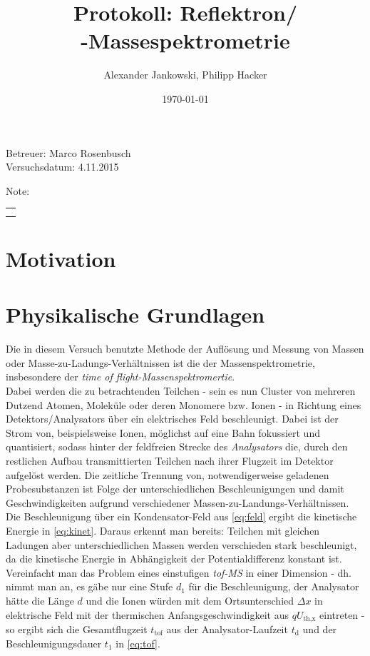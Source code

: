 \documentclass[numbers=noenddot,a4paper,notitlepage,twoside,BCOR15mm]{scrartcl}
\title{Protokoll: Reflektron/\\\tilt{time of flight}-Massespektrometrie} %
\author{Alexander Jankowski, Philipp Hacker}
\date{\today}
\newcommand{\ix}[1]{_\text{#1}}
\newcommand{\tilt}[1]{\textit{#1}}
\begin{document}
	\maketitle
	\begin{center}
		Betreuer: Marco Rosenbusch \\ %
		Versuchsdatum: 4.11.2015 \\ %
		\begin{table}[h]
			\centering
			Note: %
			\begin{tabularx}{1.5cm}{|X|}
				\hline \\ \\
				\hline
			\end{tabularx}
		\end{table}
	\end{center}
	\vspace*{\fill}
	\tableofcontents
	\vfill
	\newpage
	\section{Motivation}
	
	\newpage
	\section{Physikalische Grundlagen}

		Die in diesem Versuch benutzte Methode der Auflösung und Messung von Massen oder Masse-zu-Ladungs-Verhältnissen ist die der Massenspektrometrie, insbesondere der \tilt{time of flight-Massenspektromertie}.\\
		Dabei werden die zu betrachtenden Teilchen - sein es nun Cluster von mehreren Dutzend Atomen, Moleküle oder deren Monomere bzw. Ionen - in Richtung eines Detektors/Analysators über ein elektrisches Feld beschleunigt. Dabei ist der Strom von, beispielsweise Ionen, möglichst auf eine Bahn fokussiert und quantisiert, sodass hinter der feldfreien Strecke des \tilt{Analysators} die, durch den restlichen Aufbau transmittierten Teilchen nach ihrer Flugzeit im Detektor aufgelöst werden. Die zeitliche Trennung von, notwendigerweise geladenen Probesubstanzen ist Folge der unterschiedlichen Beschleunigungen und damit Geschwindigkeiten aufgrund verschiedener Massen-zu-Landungs-Verhältnissen.\\
		Die Beschleunigung über ein Kondensator-Feld aus \autoref{eq:feld} ergibt die kinetische Energie in \autoref{eq:kinet}. Daraus erkennt man bereits: Teilchen mit gleichen Ladungen aber unterschiedlichen Massen werden verschieden stark beschleunigt, da die kinetische Energie in Abhängigkeit der Potentialdifferenz konstant ist. Vereinfacht man das Problem eines einstufigen \tilt{tof-MS} in einer Dimension - dh. nimmt man an, es gäbe nur eine Stufe $d\ix{1}$ für die Beschleunigung, der Analysator hätte die Länge $d$ und die Ionen würden mit dem Ortsunterschied $\Delta x$ in elektrische Feld mit der thermischen Anfangsgeschwindigkeit aus $qU\ix{th,x}$ eintreten - so ergibt sich die Gesamtflugzeit $t\ix{tof}$ aus der Analysator-Laufzeit $t\ix{d}$ und der Beschleunigungsdauer $t\ix{1}$ in \autoref{eq:tof}.
\end{document}
